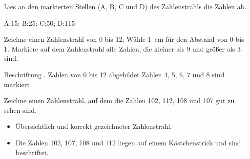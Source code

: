 
\begin{Aufgabe}{2}
	Lies an den markierten Stellen (A, B, C und D) des Zahlenstrahls die Zahlen ab.

\end{Aufgabe}

\begin{Loesung}
	A:\@15; \HalberPunkt{}\hspace{.3cm} B:\@25; \HalberPunkt{}\hspace{.3cm} C:50; \HalberPunkt{}\hspace{.3cm} D:\@115 \HalberPunkt{}
\end{Loesung}

\begin{Aufgabe}{2}
	\begin{tasks}
		\task Zeichne einen Zahlenstrahl von 0 bis 12. Wähle \SI{1}{\centi\meter} für den Abstand von 0 bis 1.
		\task Markiere auf dem Zahlenstrahl alle Zahlen, die kleiner als 9 und größer als 3 sind.
	\end{tasks}
\end{Aufgabe}

\begin{Loesung}
	\begin{tasks}
		\task Beschriftung \HalberPunkt{}. Zahlen von 0 bis 12 abgebildet \HalberPunkt{}
		\task Zahlen 4, 5, 6, 7 und 8 sind markiert \Punkt{}
	\end{tasks}
\end{Loesung}

\begin{Aufgabe}{2}
	Zeichne einen Zahlenstrahl, auf dem die Zahlen 102, 112, 108 und 107 gut zu sehen sind.
\end{Aufgabe}

\begin{Loesung}
	\begin{itemize}
		\item[\Punkt{}] Übersichtlich und korrekt gezeichneter Zahlenstrahl.
		\item[\Punkt{}] Die Zahlen 102, 107, 108 und 112 liegen auf einem Kästchenstrich und sind beschriftet.
	\end{itemize}
\end{Loesung}
